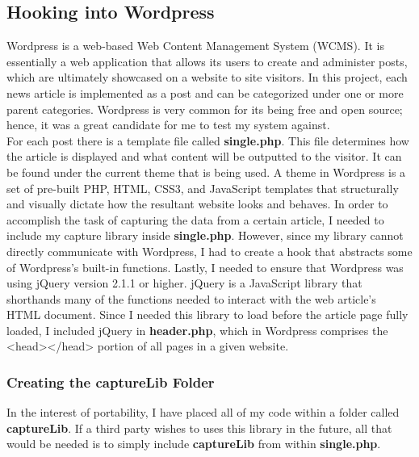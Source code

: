 \documentclass[12pt]{article}
\begin{document}
{\subsection{Hooking into Wordpress}
Wordpress is a web-based Web Content Management System (WCMS). It is essentially a web application that allows its users to create and administer posts, which are ultimately showcased on a website to site visitors. In this project, each news article is implemented as a post and can be categorized under one or more parent categories. Wordpress is very common for its being free and open source; hence, it was a great candidate for me to test my system against. \\
For each post there is a template file called \textbf{single.php}. This file determines how the article is displayed and what content will be outputted to the visitor. It can be found under the current theme that is being used. A theme in Wordpress is a set of pre-built PHP, HTML, CSS3, and JavaScript templates that structurally and visually dictate how the resultant website looks and behaves. In order to accomplish the task of capturing the data from a certain article, I needed to include my capture library inside \textbf{single.php}. However, since my library cannot directly communicate with Wordpress, I had to create a hook that abstracts some of Wordpress's built-in functions. Lastly, I needed to ensure that Wordpress was using jQuery version 2.1.1 or higher. jQuery is a JavaScript library that shorthands many of the functions needed to interact with the web article's HTML document. Since I needed this library to load before the article page fully loaded, I included jQuery in \textbf{header.php}, which in Wordpress comprises the <head></head> portion of all pages in a given website. 

\newpage 

\subsubsection{Creating the captureLib Folder} 
In the interest of portability, I have placed all of my code within a folder called \textbf{captureLib}. If a third party wishes to uses this library in the future, all that would be needed is to simply include \textbf{captureLib} from within \textbf{single.php}. \\


}
\end{document}
